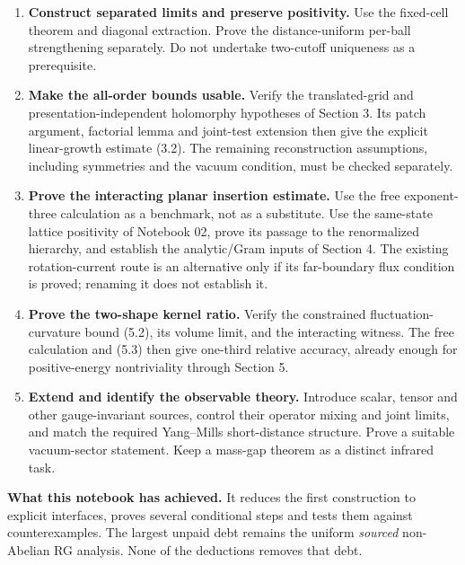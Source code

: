 \documentclass[11pt]{article}
\theoremstyle{remark}
\begin{document}
\begin{enumerate}
trajectory and preparatory-window inputs. Reconcile the three-link
localized description with that global route before treating its
unresolved assumptions as prerequisites.
\item \textbf{Construct separated limits and preserve positivity.}
Use the fixed-cell theorem and diagonal extraction. Prove the
distance-uniform per-ball strengthening separately. Do not undertake
two-cutoff uniqueness as a prerequisite.
\item \textbf{Make the all-order bounds usable.}
Verify the translated-grid and presentation-independent holomorphy
hypotheses of Section 3. Its patch argument, factorial lemma and
joint-test extension then give the explicit linear-growth estimate
(3.2). The remaining reconstruction assumptions, including symmetries
and the vacuum condition, must be checked separately.
\item \textbf{Prove the interacting planar insertion estimate.}
Use the free exponent-three calculation as a benchmark, not as a
substitute. Use the same-state lattice positivity of Notebook 02, prove
its passage to the renormalized hierarchy, and establish the
analytic/Gram inputs of Section 4. The existing rotation-current route
is an alternative only if its far-boundary flux condition is proved;
renaming it does not establish it.
\item \textbf{Prove the two-shape kernel ratio.}
Verify the constrained fluctuation-curvature bound (5.2), its volume
limit, and the interacting witness. The free calculation and (5.3)
then give one-third relative accuracy, already enough for
positive-energy nontriviality through Section 5.
\item \textbf{Extend and identify the observable theory.}
Introduce scalar, tensor and other gauge-invariant sources, control
their operator mixing and joint limits, and match the required
Yang--Mills short-distance structure. Prove a suitable vacuum-sector
statement. Keep a mass-gap theorem as a distinct infrared task.
\end{enumerate}

\noindent\textbf{What this notebook has achieved.}
It reduces the first construction to explicit interfaces, proves several
conditional steps and tests them against counterexamples. The largest
unpaid debt remains the uniform \emph{sourced} non-Abelian RG analysis.
None of the deductions removes that debt.
\end{document}
